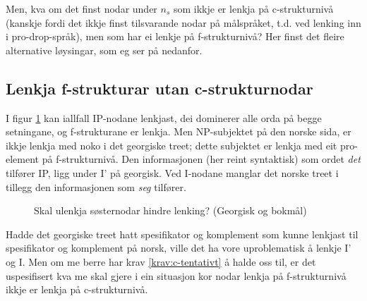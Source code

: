 \documentclass[12pt,a4paper,oneside,draft]{report}
\newcommand{\proj}[2]{\begin{tabular}{c}\footnotesize{#1}\\\normalsize{#2}\end{tabular}}
\newcommand{\ua}{\ensuremath{\uparrow}}
\newcommand{\da}{\ensuremath{\downarrow}}
\begin{document}
Men, kva om det finst nodar under $n_s$ som ikkje er lenkja på
c\hyp{}strukturnivå (kanskje fordi det ikkje finst tilsvarande nodar på
målspråket, t.d. ved lenking inn i pro-drop-språk), men som har ei
lenkje på f\hyp{}strukturnivå?  Her finst det fleire alternative løysingar,
som eg ser på nedanfor.

\subsection{Lenkja f\hyp{}strukturar utan c\hyp{}strukturnodar}
\label{sec-3.7.1}

\label{SEC:f-lenkje-utan-c-node}

I figur \ref{fig:gaiGo} kan iallfall IP-nodane lenkjast, dei dominerer
alle orda på begge setningane, og f\hyp{}strukturane er lenkja. Men
NP-subjektet på den norske sida, er ikkje lenkja med noko i det
georgiske treet; dette subjektet er lenkja med eit pro-element på
f\hyp{}strukturnivå. Den informasjonen (her reint syntaktisk) som ordet
\emph{det} tilfører IP, ligg under I' på georgisk. Ved I-nodane manglar
det norske treet i tillegg den informasjonen som \emph{seg} tilfører.

\begin{figure}[htp]
\centering
{}
\caption{Skal ulenkja søsternodar hindre lenking? (Georgisk og bokmål)}
 \label{fig:gaiGo}
\end{figure}

Hadde det georgiske treet hatt spesifikator og komplement som kunne
lenkjast til spesifikator og komplement på norsk, ville det ha vore
uproblematisk å lenkje I' og I. Men om me berre har krav
\ref{krav:c-tentativt} å halde oss til, er det uspesifisert kva me
skal gjere i ein situasjon kor nodar lenkja på f\hyp{}strukturnivå ikkje er
lenkja på c\hyp{}strukturnivå.
\end{document}
